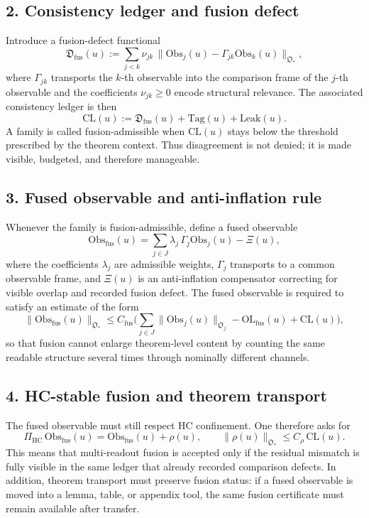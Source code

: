\subsection*{2. Consistency ledger and fusion defect}
Introduce a fusion-defect functional
\[
\mathfrak D_{\mathrm{fus}}(u)
:= \sum_{j<k}\nu_{jk}\,\|\mathrm{Obs}_j(u)-\Gamma_{jk}\mathrm{Obs}_k(u)\|_{\mathfrak O_*},
\]
where $\Gamma_{jk}$ transports the $k$-th observable into the comparison frame of the
$j$-th observable and the coefficients $\nu_{jk}\ge 0$ encode structural relevance.
The associated consistency ledger is then
\[
\mathrm{CL}(u):=\mathfrak D_{\mathrm{fus}}(u)+\mathrm{Tag}(u)+\mathrm{Leak}(u).
\]
A family is called fusion-admissible when $\mathrm{CL}(u)$ stays below the threshold
prescribed by the theorem context. Thus disagreement is not denied; it is made
visible, budgeted, and therefore manageable.

\subsection*{3. Fused observable and anti-inflation rule}
Whenever the family is fusion-admissible, define a fused observable
\[
\mathrm{Obs}_{\mathrm{fus}}(u)=\sum_{j\in J}\lambda_j\,\Gamma_j\mathrm{Obs}_j(u)-\Xi(u),
\]
where the coefficients $\lambda_j$ are admissible weights, $\Gamma_j$ transports to a
common observable frame, and $\Xi(u)$ is an anti-inflation compensator correcting
for visible overlap and recorded fusion defect. The fused observable is required
to satisfy an estimate of the form
\[
\|\mathrm{Obs}_{\mathrm{fus}}(u)\|_{\mathfrak O_*}
\le C_{\mathrm{fus}}
\bigl(
\sum_{j\in J}\|\mathrm{Obs}_j(u)\|_{\mathfrak O_j}
-\mathrm{OL}_{\mathrm{fus}}(u)
+\mathrm{CL}(u)
\bigr),
\]
so that fusion cannot enlarge theorem-level content by counting the same readable
structure several times through nominally different channels.

\subsection*{4. HC-stable fusion and theorem transport}
The fused observable must still respect HC confinement. One therefore asks for
\[
\Pi_{\mathrm{HC}}\,\mathrm{Obs}_{\mathrm{fus}}(u)
=\mathrm{Obs}_{\mathrm{fus}}(u)+\rho(u),
\qquad
\|\rho(u)\|_{\mathfrak O_*}
\le C_{\rho}\,\mathrm{CL}(u).
\]
This means that multi-readout fusion is accepted only if the residual mismatch is
fully visible in the same ledger that already recorded comparison defects. In
addition, theorem transport must preserve fusion status: if a fused observable is
moved into a lemma, table, or appendix tool, the same fusion certificate must
remain available after transfer.

